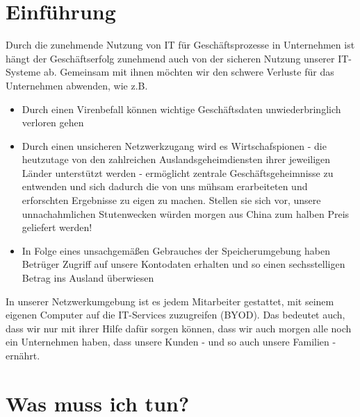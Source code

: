 \documentclass[]{article}
\date{}
\begin{document}
\section{Einführung}\label{einfuxfchrung}

Durch die zunehmende Nutzung von IT für Geschäftsprozesse in Unternehmen
ist hängt der Geschäftserfolg zunehmend auch von der sicheren Nutzung
unserer IT-Systeme ab. Gemeinsam mit ihnen möchten wir den schwere
Verluste für das Unternehmen abwenden, wie z.B.

\begin{itemize}
\item
  Durch einen Virenbefall können wichtige Geschäftsdaten
  unwiederbringlich verloren gehen
\item
  Durch einen unsicheren Netzwerkzugang wird es Wirtschafspionen - die
  heutzutage von den zahlreichen Auslandsgeheimdiensten ihrer jeweiligen
  Länder unterstützt werden - ermöglicht zentrale Geschäftsgeheimnisse
  zu entwenden und sich dadurch die von uns mühsam erarbeiteten und
  erforschten Ergebnisse zu eigen zu machen. Stellen sie sich vor,
  unsere unnachahmlichen Stutenwecken würden morgen aus China zum halben
  Preis geliefert werden!
\item
  In Folge eines unsachgemäßen Gebrauches der Speicherumgebung haben
  Betrüger Zugriff auf unsere Kontodaten erhalten und so einen
  sechsstelligen Betrag ins Ausland überwiesen
\end{itemize}

In unserer Netzwerkumgebung ist es jedem Mitarbeiter gestattet, mit
seinem eigenen Computer auf die IT-Services zuzugreifen (BYOD). Das
bedeutet auch, dass wir nur mit ihrer Hilfe dafür sorgen können, dass
wir auch morgen alle noch ein Unternehmen haben, dass unsere Kunden -
und so auch unsere Familien - ernährt.

\section{Was muss ich tun?}\label{was-muss-ich-tun}
\end{document}
